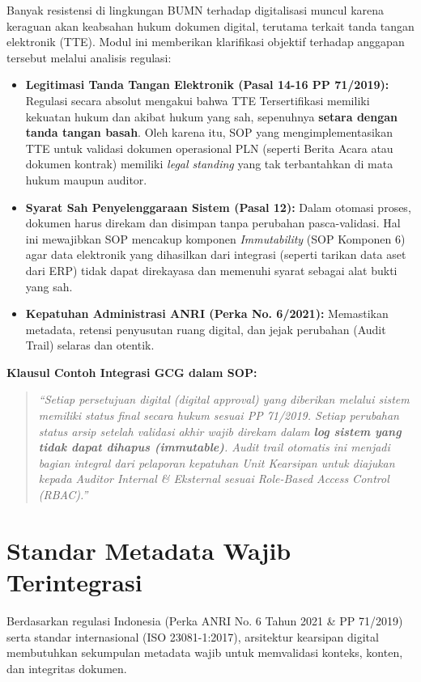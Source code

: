 \documentclass[12pt,a4paper]{report}
\begin{document}
Banyak resistensi di lingkungan BUMN terhadap digitalisasi muncul karena keraguan akan keabsahan hukum dokumen digital, terutama terkait tanda tangan elektronik (TTE). Modul ini memberikan klarifikasi objektif terhadap anggapan tersebut melalui analisis regulasi:

\begin{itemize}[leftmargin=*]
    \item \textbf{Legitimasi Tanda Tangan Elektronik (Pasal 14-16 PP 71/2019):} Regulasi secara absolut mengakui bahwa TTE Tersertifikasi memiliki kekuatan hukum dan akibat hukum yang sah, sepenuhnya \textbf{setara dengan tanda tangan basah}. Oleh karena itu, SOP yang mengimplementasikan TTE untuk validasi dokumen operasional PLN (seperti Berita Acara atau dokumen kontrak) memiliki \textit{legal standing} yang tak terbantahkan di mata hukum maupun auditor.
    \item \textbf{Syarat Sah Penyelenggaraan Sistem (Pasal 12):} Dalam otomasi proses, dokumen harus direkam dan disimpan tanpa perubahan pasca-validasi. Hal ini mewajibkan SOP mencakup komponen \textit{Immutability} (SOP Komponen 6) agar data elektronik yang dihasilkan dari integrasi (seperti tarikan data aset dari ERP) tidak dapat direkayasa dan memenuhi syarat sebagai alat bukti yang sah.
    \item \textbf{Kepatuhan Administrasi ANRI (Perka No. 6/2021):} Memastikan metadata, retensi penyusutan ruang digital, dan jejak perubahan (Audit Trail) selaras dan otentik.
\end{itemize}

\begin{plnbox}
\small
\textbf{Klausul Contoh Integrasi GCG dalam SOP:}
\begin{quote}
\textit{``Setiap persetujuan digital (\textit{digital approval}) yang diberikan melalui sistem memiliki status final secara hukum sesuai PP 71/2019. Setiap perubahan status arsip setelah validasi akhir wajib direkam dalam \textbf{log sistem yang tidak dapat dihapus (immutable)}. Audit trail otomatis ini menjadi bagian integral dari pelaporan kepatuhan Unit Kearsipan untuk diajukan kepada Auditor Internal \& Eksternal sesuai \textit{Role-Based Access Control} (RBAC).''}
\end{quote}
\end{plnbox}

\section{Standar Metadata Wajib Terintegrasi}
Berdasarkan regulasi Indonesia (Perka ANRI No. 6 Tahun 2021 \& PP 71/2019) serta standar internasional (ISO 23081-1:2017), arsitektur kearsipan digital membutuhkan sekumpulan metadata wajib untuk memvalidasi konteks, konten, dan integritas dokumen. 
\end{document}
